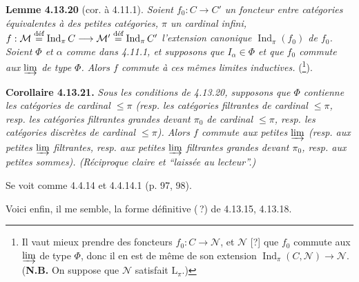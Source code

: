 \documentclass[11pt]{article}
\newcommand{\msp}[1]{\marginpar{\footnotesize [#1]}}
\newcommand{\Ind}{\operatorname{Ind}}
\begin{document}
\textbf{Lemme 4.13.20} (cor. à 4.11.1). \textit{Soient $f_0 : C\longrightarrow C'$ un foncteur entre catégories équivalentes à des petites catégories, $\pi$ un cardinal infini, $f:\mathcal{M}\stackrel{\textup{déf}}{=}\Ind_\pi C\longrightarrow\mathcal{M}'\stackrel{\textup{déf}}{=}\Ind_\pi C'$ l'extension canonique $\Ind_\pi(f_0)$ de $f_0$. Soient $\Phi$ et $\alpha$ comme dans 4.11.1, et supposons que $I_\alpha\in\Phi$ et que $f_0$ commute aux $\varinjlim$ de type $\Phi$. Alors $f$ commute à ces mêmes limites inductives.} (\footnote{Il vaut mieux prendre des foncteurs $f_0 : C\longrightarrow\mathcal{N}$, et $\mathcal{N}$ [?] que $f_0$ commute aux $\varinjlim$ de type $\Phi$, donc il en est de même de son extension $\Ind_\pi(C,\mathcal{N})\longrightarrow\mathcal{N}$. (\textbf{N.B.} On suppose que $\mathcal{N}$ satisfait $\mathrm{L}_\pi$.)}).

\textbf{Corollaire 4.13.21.} \textit{Sous les conditions de 4.13.20, supposons que $\Phi$ contienne les catégories de cardinal $\leqslant\pi$ (resp. les catégories filtrantes de cardinal $\leqslant\pi$, resp. les catégories filtrantes grandes devant $\pi_0$ de cardinal $\leqslant\pi$, resp. les catégories discrètes de cardinal $\leqslant\pi$). Alors $f$ commute aux petites $\varinjlim$ (resp. aux petites $\varinjlim$ filtrantes, resp. aux petites $\varinjlim$ filtrantes grandes devant $\pi_0$, resp. aux petites sommes). (Réciproque claire et “laissée au lecteur”.)}

Se voit comme 4.4.14 et 4.4.14.1 (p. 97, 98).

\msp{page 342}
Voici enfin, il me semble, la forme définitive (\,?) de 4.13.15, 4.13.18.
\end{document}
